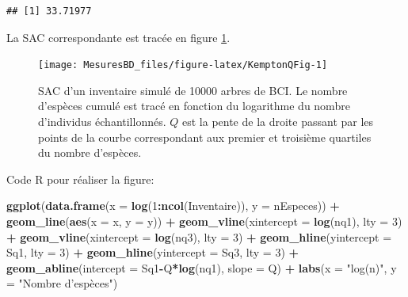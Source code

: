 \documentclass[
  11pt,
  french,
  a4paper,
  extrafontsizes,onecolumn,openright
  ]{memoir}
\newenvironment{Shaded}{\begin{snugshade}}{\end{snugshade}}
\newcommand{\DataTypeTok}[1]{\textcolor[rgb]{0.13,0.29,0.53}{#1}}
\newcommand{\DecValTok}[1]{\textcolor[rgb]{0.00,0.00,0.81}{#1}}
\newcommand{\KeywordTok}[1]{\textcolor[rgb]{0.13,0.29,0.53}{\textbf{#1}}}
\newcommand{\NormalTok}[1]{#1}
\newcommand{\OperatorTok}[1]{\textcolor[rgb]{0.81,0.36,0.00}{\textbf{#1}}}
\newcommand{\StringTok}[1]{\textcolor[rgb]{0.31,0.60,0.02}{#1}}
\begin{document}
\begin{verbatim}
## [1] 33.71977
\end{verbatim}

\normalsize

La SAC correspondante est tracée en figure \ref{fig:KemptonQFig}.



\scriptsize

\begin{figure}

{\centering \texttt{[image: MesuresBD\_files/figure-latex/KemptonQFig-1]} 

}

\caption{SAC d'un inventaire simulé de 10000 arbres de BCI. Le nombre d'espèces cumulé est tracé en fonction du logarithme du nombre d'individus échantillonnés. \(Q\) est la pente de la droite passant par les points de la courbe correspondant aux premier et troisième quartiles du nombre d'espèces.}\label{fig:KemptonQFig}
\end{figure}

\normalsize

Code R pour réaliser la figure:

\scriptsize

\begin{Shaded}
\begin{Highlighting}[]
\KeywordTok{ggplot}\NormalTok{(}\KeywordTok{data.frame}\NormalTok{(}\DataTypeTok{x =} \KeywordTok{log}\NormalTok{(}\DecValTok{1}\OperatorTok{:}\KeywordTok{ncol}\NormalTok{(Inventaire)), }\DataTypeTok{y =}\NormalTok{ nEspeces)) }\OperatorTok{+}
\StringTok{  }\KeywordTok{geom_line}\NormalTok{(}\KeywordTok{aes}\NormalTok{(}\DataTypeTok{x =}\NormalTok{ x, }\DataTypeTok{y =}\NormalTok{ y)) }\OperatorTok{+}
\StringTok{  }\KeywordTok{geom_vline}\NormalTok{(}\DataTypeTok{xintercept =} \KeywordTok{log}\NormalTok{(nq1), }\DataTypeTok{lty =} \DecValTok{3}\NormalTok{) }\OperatorTok{+}
\StringTok{  }\KeywordTok{geom_vline}\NormalTok{(}\DataTypeTok{xintercept =} \KeywordTok{log}\NormalTok{(nq3), }\DataTypeTok{lty =} \DecValTok{3}\NormalTok{) }\OperatorTok{+}
\StringTok{  }\KeywordTok{geom_hline}\NormalTok{(}\DataTypeTok{yintercept =}\NormalTok{ Sq1, }\DataTypeTok{lty =} \DecValTok{3}\NormalTok{) }\OperatorTok{+}
\StringTok{  }\KeywordTok{geom_hline}\NormalTok{(}\DataTypeTok{yintercept =}\NormalTok{ Sq3, }\DataTypeTok{lty =} \DecValTok{3}\NormalTok{) }\OperatorTok{+}
\StringTok{  }\KeywordTok{geom_abline}\NormalTok{(}\DataTypeTok{intercept =}\NormalTok{ Sq1}\OperatorTok{-}\NormalTok{Q}\OperatorTok{*}\KeywordTok{log}\NormalTok{(nq1), }\DataTypeTok{slope =}\NormalTok{ Q) }\OperatorTok{+}
\StringTok{  }\KeywordTok{labs}\NormalTok{(}\DataTypeTok{x =} \StringTok{"log(n)"}\NormalTok{, }\DataTypeTok{y =} \StringTok{"Nombre d'espèces"}\NormalTok{)}
\end{Highlighting}
\end{Shaded}
\end{document}
